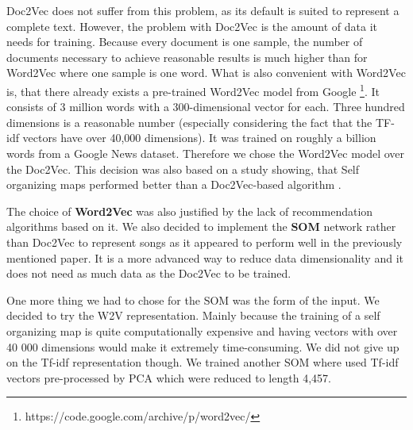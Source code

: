 Doc2Vec does not suffer from this problem, as its default is suited to represent a complete text. However, the problem with Doc2Vec is the amount of data it needs for training. Because every document is one sample, the number of documents necessary to achieve reasonable results is much higher than for Word2Vec where one sample is one word. What is also convenient with Word2Vec is, that there already exists a pre-trained Word2Vec model from Google \footnote{https://code.google.com/archive/p/word2vec/}. It consists of 3 million words with a 300-dimensional vector for each. Three hundred dimensions is a reasonable number (especially considering the fact that the TF-idf vectors have over 40,000 dimensions). It was trained on roughly a billion words from a Google News dataset. Therefore we chose the Word2Vec model over the Doc2Vec. This decision was also based on a study showing, that Self organizing maps performed better than a Doc2Vec-based algorithm \cite{inproceedings}. 

The choice of \textbf{Word2Vec} was also justified by the lack of recommendation algorithms based on it. We also decided to implement the \textbf{SOM} network rather than Doc2Vec to represent songs as it appeared to perform well in the previously mentioned paper. It is a more advanced way to reduce data dimensionality and it does not need as much data as the Doc2Vec to be trained. 

One more thing we had to chose for the SOM was the form of the input. We decided to try the W2V representation. Mainly because the training of a self organizing map is quite computationally expensive and having vectors with over 40 000 dimensions would make it extremely time-consuming. We did not give up on the Tf-idf representation though. We trained another SOM where used Tf-idf vectors pre-processed by PCA which were reduced to length 4,457. 

